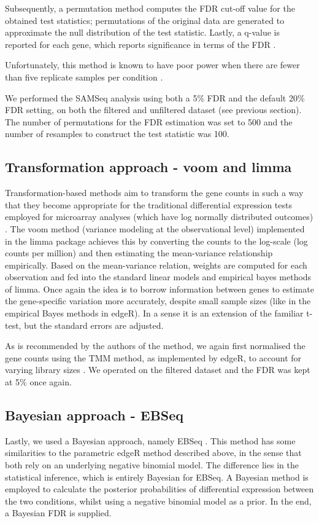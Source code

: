 \documentclass[a4paper,10pt]{article}\usepackage[]{graphicx}\usepackage[]{color}
\begin{document}
Subsequently, a permutation method computes the FDR cut-off value for the obtained test statistics; permutations of the original data are generated to approximate the null distribution of the test statistic. Lastly, a q-value is reported for each gene, which reports significance in terms of the FDR \autocite{storey_statistical_2003}.

Unfortunately, this method is known to have poor power when there are fewer than five replicate samples per condition \autocite{soneson_comparison_2013,seyednasrollah_comparison_2015}.

We performed the SAMSeq analysis using both a 5\% FDR and the default 20\% FDR setting, on both the filtered and unfiltered dataset (see previous section). The number of permutations for the FDR estimation was set to 500 and the number of resamples to construct the test statistic was 100.

\subsection{Transformation approach - voom and limma}
Transformation-based methods aim to transform the gene counts in such a way that they become appropriate for the traditional differential expression tests employed for microarray analyses (which have log normally distributed outcomes) \autocite{soneson_comparison_2013}. The voom method (variance modeling at the observational level) implemented in the limma package \autocite{ritchie_limma_2015,law_voom_2014} achieves this by converting the counts to the log-scale (log counts per million) and then estimating the mean-variance relationship empirically. Based on the mean-variance relation, weights are computed for each observation and fed into the standard linear models and empirical bayes methods of limma. Once again the idea is to borrow information between genes to estimate the gene-specific variation more accurately, despite small sample sizes (like in the empirical Bayes methods in edgeR). In a sense it is an extension of the familiar t-test, but the standard errors are adjusted. 

As is recommended by the authors of the method, we again first normalised the gene counts using the TMM method, as implemented by edgeR, to account for varying library sizes \autocite{smyth_limma_2015}. We operated on the filtered dataset and the FDR was kept at 5\% once again.

\subsection{Bayesian approach - EBSeq}
Lastly, we used a Bayesian approach, namely EBSeq \autocite{leng_ebseq_2013}. This method has some similarities to the parametric edgeR method described above, in the sense that both rely on an underlying negative binomial model. The difference lies in the statistical inference, which is entirely Bayesian for EBSeq. A Bayesian method is employed to calculate the posterior probabilities of differential expression between the two conditions, whilst using a negative binomial model as a prior. In the end, a Bayesian FDR is supplied.
\end{document}

